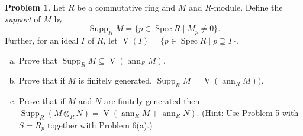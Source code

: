 \documentclass[11pt]{article}
\theoremstyle{definition}
\newtheorem{problem}{Problem}
\newcommand{\V}{\operatorname{V}}
\newcommand{\Spec}{\operatorname{Spec}}
\newcommand{\Supp}{\operatorname{Supp}}
\newcommand{\ann}{\operatorname{ann}}
\begin{document}
\begin{problem} Let $R$ be a commutative ring and $M$ and $R$-module.  Define the {\it support} of $M$ by
$$\Supp_R M=\{p\in \Spec R\mid M_p\neq 0\}.$$  Further, for an ideal $I$ of $R$, let $\V(I)=\{p\in \Spec R\mid p\supseteq I\}$.
\begin{enumerate}[(a)]
\item Prove that $\Supp_R M\subseteq \V(\ann_R M)$.
\item Prove that if $M$ is finitely generated, $\Supp_R M=\V(\ann_R M))$.
\item Prove that if $M$ and $N$ are finitely generated then $\Supp_R (M\otimes_R N)=\V(\ann_R M+\ann_R N)$. (Hint: Use Problem 5 with $S=R_p$ together with Problem 6(a).)
\end{enumerate}

\end{problem}
\end{document}
